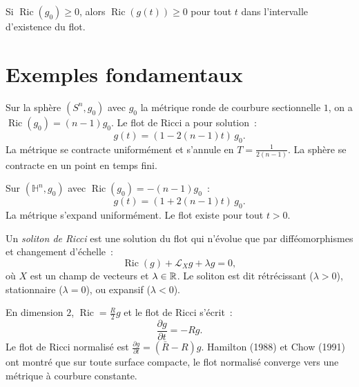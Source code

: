 \begin{corollaire}
Si $\operatorname{Ric}(g_0) \geq 0$, alors $\operatorname{Ric}(g(t)) \geq 0$
pour tout $t$ dans l'intervalle d'existence du flot.
\end{corollaire}

\section{Exemples fondamentaux}

\begin{exemple}
Sur la sph\`ere $(S^n, g_0)$ avec $g_0$ la m\'etrique ronde de courbure sectionnelle $1$,
on a $\operatorname{Ric}(g_0) = (n-1)g_0$. Le flot de Ricci a pour solution~:
\[
    g(t) = (1 - 2(n-1)t)\, g_0.
\]
La m\'etrique se contracte uniform\'ement et s'annule en $T = \frac{1}{2(n-1)}$.
La sph\`ere se contracte en un point en temps fini.
\end{exemple}

\begin{exemple}
Sur $(\mathbb{H}^n, g_0)$ avec $\operatorname{Ric}(g_0) = -(n-1)g_0$~:
\[
    g(t) = (1 + 2(n-1)t)\, g_0.
\]
La m\'etrique s'expand uniform\'ement. Le flot existe pour tout $t > 0$.
\end{exemple}

\begin{exemple}
Un \emph{soliton de Ricci} est une solution du flot qui n'\'evolue que par
diff\'eomorphismes et changement d'\'echelle~:
\[
    \operatorname{Ric}(g) + \mathcal{L}_X g + \lambda g = 0,
\]
o\`u $X$ est un champ de vecteurs et $\lambda \in \mathbb{R}$. Le soliton est dit
r\'etr\'ecissant ($\lambda > 0$), stationnaire ($\lambda = 0$), ou expansif ($\lambda < 0$).
\end{exemple}

\begin{exemple}
En dimension $2$, $\operatorname{Ric} = \frac{R}{2}g$ et le flot de Ricci s'\'ecrit~:
\[
    \frac{\partial g}{\partial t} = -Rg.
\]
Le flot de Ricci normalis\'e est $\frac{\partial g}{\partial t} = (\bar{R} - R)g$.
Hamilton (1988) et Chow (1991) ont montr\'e que sur toute surface compacte, le flot
normalis\'e converge vers une m\'etrique \`a courbure constante.
\end{exemple}

